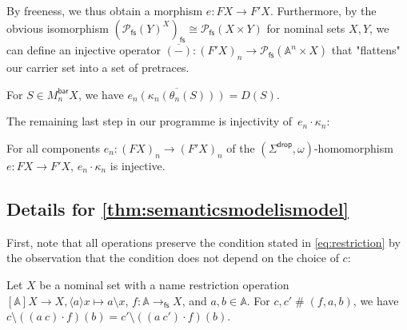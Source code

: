 \documentclass[a4paper,UKenglish,cleveref,thm-restate,numberwithinsect,final]{lipics-v2021}
\newcommand{\Br}{\mathsf{bar}}
\newcommand{\Term}{\mathsf{Term}}
\newcommand{\loc}{\mathsf{loc}}
\newcommand{\drop}{\mathsf{drop}}
\newcommand{\fs}{\mathsf{fs}}
\newcommand{\Names}{\mathbb{A}}
\newcommand{\pow}{\mathcal{P}}
\newcommand{\powfs}{\pow_{\fs}}
\newcommand{\fresh}{\mathbin{\#}}
\newcommand{\bind}[1]{\langle #1\rangle}
\theoremstyle{plain}
\numberwithin{equation}{section}
\newcommand{\+}[1]{\mathcal{#1}\xspace}
\theoremstyle{definition}
\begin{document}
\noindent By freeness, we thus obtain a morphism $e\colon FX\to F'X$.
Furthermore, by the obvious isomorphism $(\powfs(Y)^X)_\fs \cong \powfs(X \times Y)$ for nominal sets $X, Y$, we can define an injective operator $\overline{(-)} \colon (F'X)_n \to \powfs(\Names^n \times X)$ that "flattens" our carrier set into a set of pretraces.
\begin{lemma}\label{thm:languageinterpretationofpretraces}
  For $S\in M_n^\Br X$, we have $\overline{e_n(\kappa_n(\theta_n(S)))}=D(S)$.
\end{lemma}
\noindent The remaining last step in our programme is injectivity
of~$e_n \cdot \kappa_n$:
\begin{lemma}\label{thm:localfreshnessinjectivity}
  For all components $e_n : (FX)_n \to (F'X)_n$ of the $(\Sigma^\drop,\omega)$-homomorphism $e\colon FX \to F'X$, $e_n \cdot \kappa_n$ is injective.
\end{lemma}

\subsection*{Details for \cref{thm:semanticsmodelismodel}}

First, note that all operations preserve the condition stated in \eqref{eq:restriction} by the observation that the condition does not depend on the choice of \(c\):

\begin{lemma}
  Let \(X\) be a nominal set with a name restriction operation \([\Names]X \to X, \bind{a} x \mapsto a \setminus x\), \(f\colon \Names \to_\fs X\), and \(a,b \in \Names\).
  For \(c,c'\fresh(f,a,b)\), we have \(c \setminus ((a\ c) \cdot f)(b) = c' \setminus ((a\ c') \cdot f)(b)\).
\end{lemma}
\end{document}

